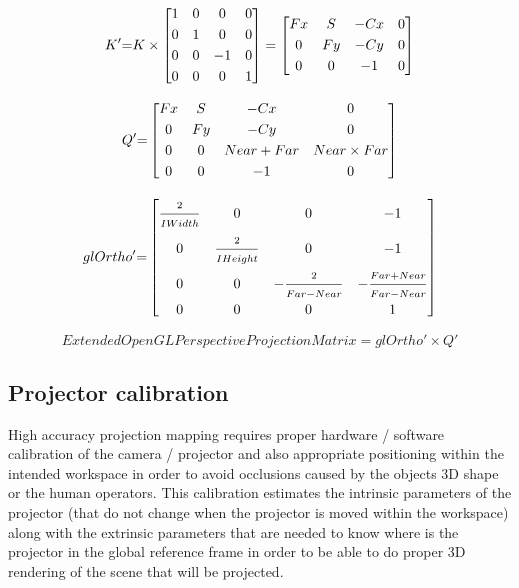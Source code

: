 {	\begin{equation}\label{eq:k2}
		K'{=}
		K
		\times
		\begin{bmatrix}
		1 & 0 & 0 & 0 \\[\smallskipamount]
		0 & 1 & 0 & 0 \\[\smallskipamount]
		0 & 0 & -1 & 0 \\[\smallskipamount]
		0 & 0 & 0 & 1
		\end{bmatrix}
		=
		\begin{bmatrix}
		Fx & S & -Cx & 0 \\[\smallskipamount]
		0 & Fy & -Cy & 0 \\[\smallskipamount]
		0 & 0 & -1 & 0
		\end{bmatrix}
	\end{equation}

	\begin{equation}\label{eq:perspective-matrix}
		Q'{=}
		\begin{bmatrix}
			Fx & S & -Cx & 0 \\[\smallskipamount]
			0 & Fy & -Cy & 0 \\[\smallskipamount]
			0 & 0 & Near + Far & Near \times Far \\[\smallskipamount]
			0 & 0 & -1 & 0
		\end{bmatrix}
	\end{equation}

	\begin{equation}\label{eq:ndc-matrix}
		glOrtho'{=}
		\begin{bmatrix}
			\vfrac{2}{IWidth} & 0 & 0 & -1 \\[\smallskipamount]
			0 & \vfrac{2}{IHeight} & 0 & -1 \\[\smallskipamount]
			0 & 0 & -\vfrac{2}{Far - Near} & -\vfrac{Far + Near}{Far - Near} \\[\smallskipamount]
			0 & 0 & 0 & 1
		\end{bmatrix}
	\end{equation}

	\begin{equation}\label{eq:projection-matrix}
		ExtendedOpenGLPerspectiveProjectionMatrix = glOrtho' \times Q'
	\end{equation}
}


\subsection{Projector calibration}

High accuracy projection mapping requires proper hardware / software calibration of the camera / projector and also appropriate positioning within the intended workspace in order to avoid occlusions caused by the objects 3D shape or the human operators. This calibration estimates the intrinsic parameters of the projector (that do not change when the projector is moved within the workspace) along with the extrinsic parameters that are needed to know where is the projector in the global reference frame in order to be able to do proper 3D rendering of the scene that will be projected.

